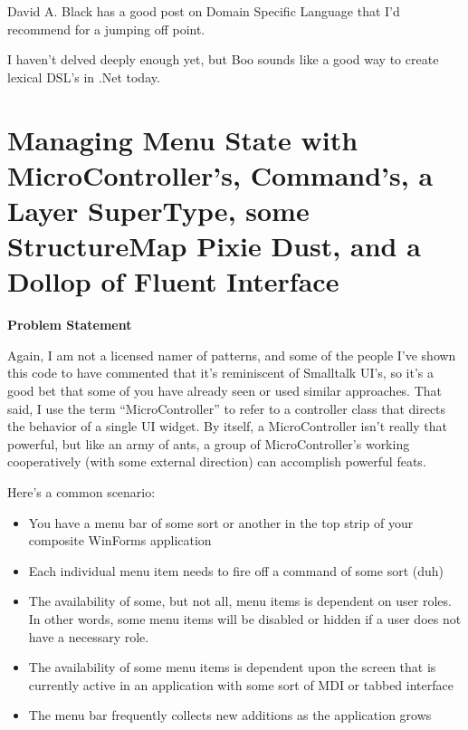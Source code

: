 \documentclass{article}
\begin{document}
{ 

David A. Black has a good post on Domain Specific Language that I'd recommend for a jumping off point.

I haven't delved deeply enough yet, but Boo sounds like a good way to create lexical DSL's in .Net today.

\section{ Managing Menu State with MicroController's, Command's, a Layer SuperType, some StructureMap Pixie Dust, and a Dollop of Fluent Interface } 

\Large {\textbf{Problem Statement}}

Again, I am not a licensed namer of patterns, and some of the people I've shown this code to have commented that it's reminiscent of Smalltalk UI's, so it's a good bet that some of you have already seen or used similar approaches.  That said, I use the term “MicroController” to refer to a controller class that directs the behavior of a single UI widget.  By itself, a MicroController isn't really that powerful, but like an army of ants, a group of MicroController's working cooperatively (with some external direction) can accomplish powerful feats. 

Here's a common scenario: 
 \begin{itemize}
   \item  You have a menu bar of some sort or another in the top strip of your composite WinForms application  
 \item  Each individual menu item needs to fire off a command of some sort (duh)  
 \item  The availability of some, but not all, menu items is dependent on user roles.  In other words, some menu items will be disabled or hidden if a user does not have a necessary role.  
 \item  The availability of some menu items is dependent upon the screen that is currently active in an application with some sort of MDI or tabbed interface  
 \item  The menu bar frequently collects new additions as the application grows  
 \end{itemize}
 
}
\end{document}
